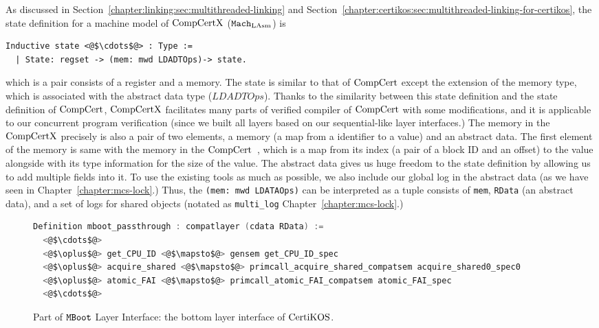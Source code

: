 As discussed in Section~\ref{chapter:linking:sec:multithreaded-linking} and Section~\ref{chapter:certikos:sec:multithreaded-linking-for-certikos},
the state definition for a machine model of  $\mathrm{CompCertX}$ (${\mathrm{\texttt{Mach}}}_{\mathrm{LAsm}}$) is
\begin{lstlisting}
Inductive state <@$\cdots$@> : Type :=
  | State: regset -> (mem: mwd LDADTOps)-> state.
\end{lstlisting}
which is a pair consists of  a register and a memory. 
The state is similar to that of $\mathrm{CompCert}$ except the extension of the memory type, which is associated with 
the abstract data type ($LDADTOps$).
Thanks to the similarity between this state definition and the state definition of $\mathrm{CompCert}$, 
$\mathrm{CompCertX}$ facilitates many parts of verified compiler of $\mathrm{CompCert}$ with some modifications, 
and it is applicable to our concurrent program verification (since 
we built all layers based on our sequential-like layer interfaces.)
The memory in the $\mathrm{CompCertX}$ precisely  is also a pair of two elements, 
a memory (a map from a identifier to a value) and an abstract data. 
The first element of the memory is same with the memory in the $\mathrm{CompCert}$~\cite{leroy08},
 which is a map from its index (a pair of a block ID and an offset) to the value alongside with its type information for the size of the value. 
The abstract data gives us huge freedom to the state definition by allowing us to add multiple fields into it. 
To use the existing tools as much as possible, 
we also include our global log in the abstract data (as we have seen in Chapter~\ref{chapter:mcs-lock}.)
Thus, the \lstinline$(mem: mwd LDATAOps)$ can be interpreted as a tuple consists of 
\lstinline$mem$, \lstinline$RData$ (an abstract data), and a set of logs for shared objects (notated as \lstinline$multi_log$ 
Chapter~\ref{chapter:mcs-lock}.)


\begin{figure}
\begin{lstlisting}[language=C]
Definition mboot_passthrough : compatlayer (cdata RData) :=
  <@$\cdots$@>
  <@$\oplus$@> get_CPU_ID <@$\mapsto$@> gensem get_CPU_ID_spec
  <@$\oplus$@> acquire_shared <@$\mapsto$@> primcall_acquire_shared_compatsem acquire_shared0_spec0
  <@$\oplus$@> atomic_FAI <@$\mapsto$@> primcall_atomic_FAI_compatsem atomic_FAI_spec
  <@$\cdots$@>
\end{lstlisting}
\caption{Part of ${\mathrm{\texttt{MBoot}}}$ Layer Interface: the bottom layer interface of $\mathrm{CertiKOS}$.}
\label{fig:chapter:certikos:bottom-layer-interface}
\end{figure}

